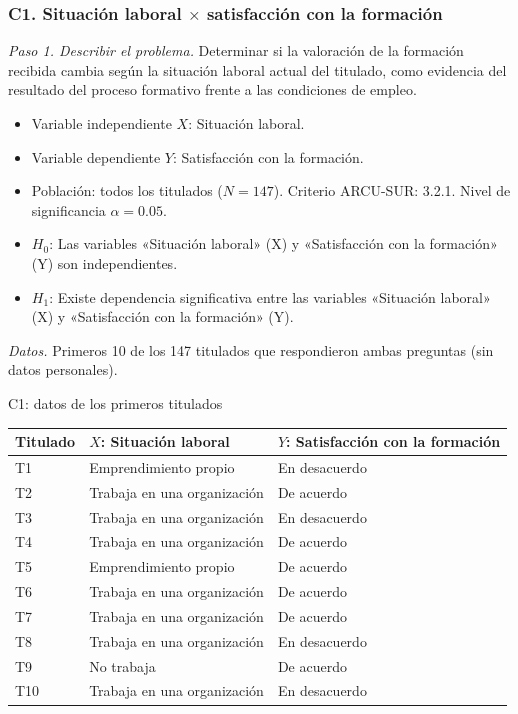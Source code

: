 \subsubsection*{C1. Situación laboral $\times$ satisfacción con la formación}

\textit{Paso 1. Describir el problema.} Determinar si la valoración de la formación recibida cambia según la situación laboral actual del titulado, como evidencia del resultado del proceso formativo frente a las condiciones de empleo.

\begin{itemize}[nosep]
  \item Variable independiente $X$: Situación laboral.
  \item Variable dependiente $Y$: Satisfacción con la formación.
  \item Población: todos los titulados ($N = 147$). Criterio ARCU-SUR: 3.2.1. Nivel de significancia $\alpha = 0.05$.
  \item $H_0$: Las variables «Situación laboral» (X) y «Satisfacción con la formación» (Y) son independientes.
  \item $H_1$: Existe dependencia significativa entre las variables «Situación laboral» (X) y «Satisfacción con la formación» (Y).
\end{itemize}

\textit{Datos.} Primeros 10 de los 147 titulados que respondieron ambas preguntas (sin datos personales).

\begin{mitabla}{C1: datos de los primeros titulados}
\begin{tabular}{lll}
\toprule
Titulado & $X$: Situación laboral & $Y$: Satisfacción con la formación \\
\midrule
T1 & Emprendimiento propio & En desacuerdo \\
T2 & Trabaja en una organización & De acuerdo \\
T3 & Trabaja en una organización & En desacuerdo \\
T4 & Trabaja en una organización & De acuerdo \\
T5 & Emprendimiento propio & De acuerdo \\
T6 & Trabaja en una organización & De acuerdo \\
T7 & Trabaja en una organización & De acuerdo \\
T8 & Trabaja en una organización & En desacuerdo \\
T9 & No trabaja & De acuerdo \\
T10 & Trabaja en una organización & En desacuerdo \\
\bottomrule
\end{tabular}
\end{mitabla}


